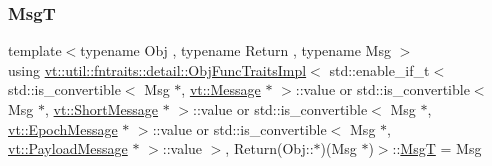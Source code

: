 \subsubsection{\texorpdfstring{MsgT}{MsgT}}
{\footnotesize\ttfamily template$<$typename Obj , typename Return , typename Msg $>$ \\
using \hyperlink{structvt_1_1util_1_1fntraits_1_1detail_1_1_obj_func_traits_impl}{vt\+::util\+::fntraits\+::detail\+::\+Obj\+Func\+Traits\+Impl}$<$ std\+::enable\+\_\+if\+\_\+t$<$ std\+::is\+\_\+convertible$<$ Msg $\ast$, \hyperlink{namespacevt_a3a3ddfef40b4c90915fa43cdd5f129ea}{vt\+::\+Message} $\ast$ $>$\+::value or std\+::is\+\_\+convertible$<$ Msg $\ast$, \hyperlink{namespacevt_a1125ac1da6c0bbf141e0ea0739d7602d}{vt\+::\+Short\+Message} $\ast$ $>$\+::value or std\+::is\+\_\+convertible$<$ Msg $\ast$, \hyperlink{namespacevt_ad67368ffae52d7325002586b41bb150e}{vt\+::\+Epoch\+Message} $\ast$ $>$\+::value or std\+::is\+\_\+convertible$<$ Msg $\ast$, \hyperlink{namespacevt_a89a92229c5622b855c02c549f83a1a68}{vt\+::\+Payload\+Message} $\ast$ $>$\+::value $>$, Return(Obj\+::$\ast$)(Msg $\ast$)$>$\+::\hyperlink{structvt_1_1util_1_1fntraits_1_1detail_1_1_obj_func_traits_impl_3_01std_1_1enable__if__t_3_01stdc67616d674616ce71c363c0e039ceb56_aa7f18dbe6abef9456e082ead8aadb75e}{MsgT} =  Msg}

